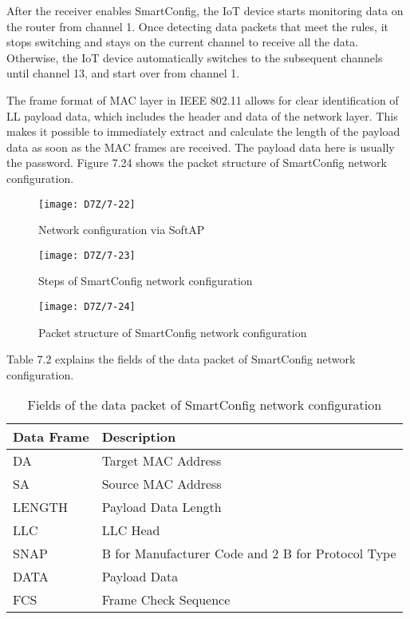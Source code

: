 \documentclass[a4paper,12pt]{book}
\begin{document}
After the receiver enables SmartConfig, the IoT device starts monitoring data on the router from channel 1. Once detecting data packets that meet the rules, it stops switching and stays on the current channel to receive all the data. Otherwise, the IoT device automatically switches to the subsequent channels until channel 13, and start over from channel 1.

The frame format of MAC layer in IEEE 802.11 allows for clear identification of LL payload data, which includes the header and data of the network layer. This makes it possible to immediately extract and calculate the length of the payload data as soon as the MAC frames are received. The payload data here is usually the password. Figure 7.24 shows the packet structure of SmartConfig network configuration.

\begin{figure}[!h]
    \centering
    \texttt{[image: D7Z/7-22]}
    \caption{Network configuration via SoftAP}
\end{figure}

\begin{figure}[!h]
    \centering
    \texttt{[image: D7Z/7-23]}
    \caption{Steps of SmartConfig network configuration}
\end{figure}

\vspace{6pt}
\begin{figure}[!h]
    \centering
    \texttt{[image: D7Z/7-24]}
    \caption{Packet structure of SmartConfig network configuration}
\end{figure}

Table 7.2 explains the fields of the data packet of SmartConfig network configuration.

\begin{table}[h!]
    \renewcommand{\arraystretch}{1.4}
    \caption{Fields of the data packet of SmartConfig network configuration}
    \begin{tabular}{|>{\Centering}m{}|>{\Centering}m{}|}
        \hline
        \rowcolor{LightBlue} \textbf{Data Frame}&\textbf{Description}\\
        \hline
        DA&Target MAC Address\\
        \hline
        SA&Source MAC Address\\
        \hline
        LENGTH&Payload Data Length\\
        \hline
        LLC&LLC Head\\
        \hline
        SNAP&3 B for Manufacturer Code and 2 B for Protocol Type\\
        \hline
        DATA&Payload Data\\
        \hline
        FCS&Frame Check Sequence\\
        \hline
    \end{tabular}
\end{table}
\end{document}

